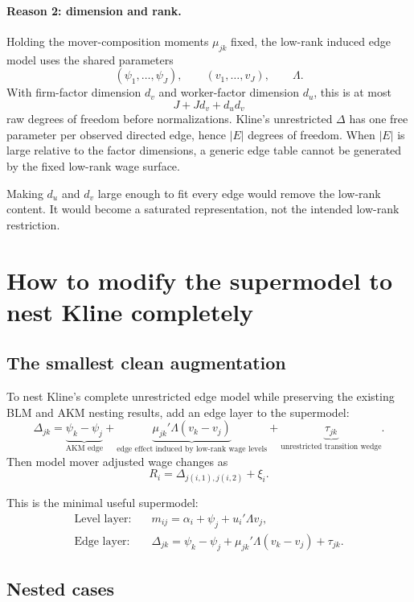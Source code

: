 \documentclass[11pt]{article}
\begin{document}
\paragraph{Reason 2: dimension and rank.}
Holding the mover-composition moments \(\mu_{jk}\) fixed, the low-rank induced
edge model uses the shared parameters
\[
(\psi_1,\ldots,\psi_J),\qquad
(v_1,\ldots,v_J),\qquad
\Lambda.
\]
With firm-factor dimension \(d_v\) and worker-factor dimension \(d_u\), this is
at most
\[
J+Jd_v+d_ud_v
\]
raw degrees of freedom before normalizations. Kline's unrestricted
\(\Delta\) has one free parameter per observed directed edge, hence
\(|E|\) degrees of freedom. When \(|E|\) is large relative to the factor
dimensions, a generic edge table cannot be generated by the fixed low-rank
wage surface.

Making \(d_u\) and \(d_v\) large enough to fit every edge would remove the
low-rank content. It would become a saturated representation, not the intended
low-rank restriction.

\section{How to modify the supermodel to nest Kline completely}

\subsection{The smallest clean augmentation}

To nest Kline's complete unrestricted edge model while preserving the existing
BLM and AKM nesting results, add an edge layer to the supermodel:
\[
\Delta_{jk}
=
\underbrace{\psi_k-\psi_j}_{\text{AKM edge}}
+
\underbrace{\mu_{jk}'\Lambda(v_k-v_j)}_{\text{edge effect induced by low-rank wage levels}}
+
\underbrace{\tau_{jk}}_{\text{unrestricted transition wedge}}.
\tag{augmented-edge}
\]
Then model mover adjusted wage changes as
\[
R_i
=
\Delta_{j(i,1),j(i,2)}+\xi_i.
\tag{augmented-Kline}
\]

This is the minimal useful supermodel:
\[
\boxed{
\begin{aligned}
\text{Level layer:}\quad
&m_{ij}=\alpha_i+\psi_j+u_i'\Lambda v_j,\\
\text{Edge layer:}\quad
&\Delta_{jk}=\psi_k-\psi_j+\mu_{jk}'\Lambda(v_k-v_j)+\tau_{jk}.
\end{aligned}
}
\tag{level-plus-edge}
\]

\subsection{Nested cases}
\end{document}
